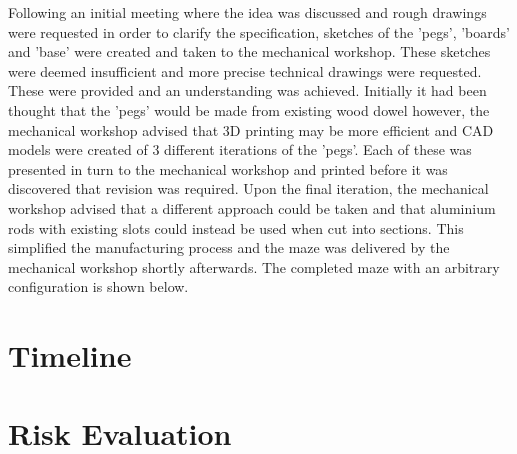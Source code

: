 Following an initial meeting where the idea was discussed and rough drawings were requested in order to clarify the specification, sketches of the 'pegs', 'boards' and 'base' were created and taken to the mechanical workshop. These sketches were deemed insufficient and more precise technical drawings were requested. These were provided and an understanding was achieved. 
	Initially it had been thought that the 'pegs' would be made from existing wood dowel however, the mechanical workshop advised that 3D printing may be more efficient and CAD models were created of 3 different iterations of the 'pegs'. Each of these was presented in turn to the mechanical workshop and printed before it was discovered that revision was required. Upon the final iteration, the mechanical workshop advised that a different approach could be taken and that aluminium rods with existing slots could instead be used when cut into sections. This simplified the manufacturing process and the maze was delivered by the mechanical workshop shortly afterwards. The completed maze with an arbitrary configuration is shown below.



\section{Timeline}\label{pm/timeline}



\section{Risk Evaluation}\label{pm/riskeval}
